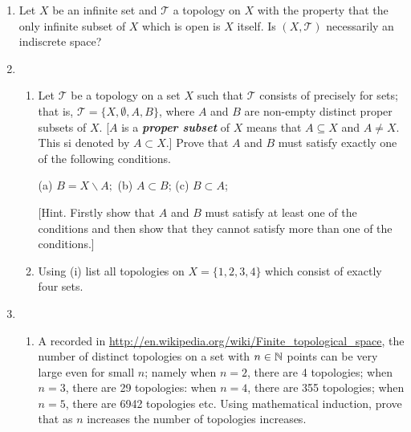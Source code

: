 \documentclass[10pt,a4paper]{report}
\newcommand{\TT}{\mathcal{T}}
\begin{document}
\begin{enumerate}
\begin{align*}
	S \subseteq X \text{ and } |S| = \infty\\
	| X\backslash S | < \infty \implies X\backslash S \text{ is open}\\
\end{align*}there are an infinite number of finite subsets whose compliment is infinite and closed.  These are precisely what make up a discrete topology.

\item Let $X$ be an infinite set and $\TT$ a topology on $X$ with the property that the only infinite subset of $X$ which is open is $X$ itself.  Is $(X,\TT)$ necessarily an indiscrete space?

\item \begin{enumerate}[label=(\roman*)]
	\item Let $\TT$ be a topology on a set $X$ such that $\TT$ consists of precisely for sets; that is, $\TT = \{X,\emptyset, A,B\}$, where $A$ and $B$ are non-empty distinct proper subsets of $X$.  [$A$ is a \textbf{\textit{proper subset}} of $X$ means that $A \subseteq X$ and $A \ne X$.  This si denoted by $A\subset X$.]  Prove that $A$ and $B$ must satisfy exactly one of the following conditions.
	\begin{center}
	(a) $B=X\backslash A;$    (b) $A \subset B$;    (c) $B\subset A$;	
	\end{center}
[Hint. Firstly show that $A$ and $B$ must satisfy at least one of the conditions and then show that they cannot satisfy more than one of the conditions.]

\item Using (i) list all topologies on $X =\{1,2,3,4\}$ which consist of exactly four sets.
	
\end{enumerate}

\item \begin{enumerate}[label=(\roman*)]
	\item A recorded in \url{http://en.wikipedia.org/wiki/Finite_topological_space}, the number of distinct topologies on a set with $n \in \mathbb{N}$ points can be very large even for small $n$; namely when $n =2$, there are 4 topologies;  when $n=3$, there are 29 topologies:  when $n=4$, there are 355 topologies;  when $n=5$, there are 6942 topologies etc.  Using mathematical induction, prove that as $n$ increases the number of topologies increases.\\
	

\end{enumerate}
\end{enumerate}
\end{document}
